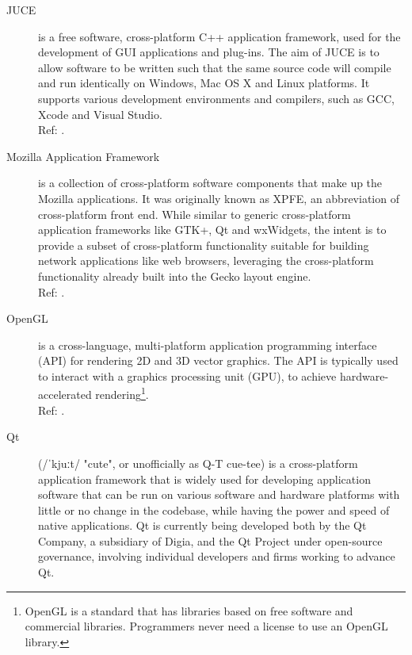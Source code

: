 \begin{description}
    \item[JUCE] is a free software, cross-platform C++ application framework, used
		for the development of GUI applications and plug-ins.
		The aim of JUCE is to allow software to be written such that
		the same source code will compile and run identically on Windows,
		Mac OS X and Linux platforms. It supports various development
		environments and compilers, such as GCC, Xcode and Visual Studio.
		\hspace*{\fill}\\Ref: \cite{wiki:juce}.

    \item[Mozilla Application Framework]
		 is a collection of cross-platform software components that
		 make up the Mozilla applications. It was originally known as
		 XPFE, an abbreviation of cross-platform front end.
		 While similar to generic cross-platform application
		 frameworks like GTK+, Qt and wxWidgets, the intent is to
		 provide a subset of cross-platform functionality suitable for
		 building network applications like web browsers, leveraging
		 the cross-platform functionality already built into the Gecko
		 layout engine.
		\hspace*{\fill}\\Ref: \cite{wiki:mozilla_application_framework}.

    \item[OpenGL] is a cross-language, multi-platform application programming
		interface (API) for rendering 2D and 3D vector graphics.
		The API is typically used to interact with a graphics
		processing unit (GPU), to achieve hardware-accelerated
		rendering\footnote{OpenGL is a standard that has libraries based on free
		software and commercial libraries. Programmers never need a license
		to use an OpenGL library.}.
		\hspace*{\fill}\\Ref: \cite{wiki:opengl}.

    \item[Qt]  (/ˈkjuːt/ "cute", or unofficially as Q-T cue-tee) is a cross-platform
		application framework that is widely used for developing application
		software that can be run on various software and hardware platforms
		with little or no change in the codebase, while having the power and
		speed of native applications. Qt is currently being developed both
		by the Qt Company, a subsidiary of Digia, and the Qt Project under
		open-source governance, involving individual developers and firms
		working to advance Qt.


\end{description}
